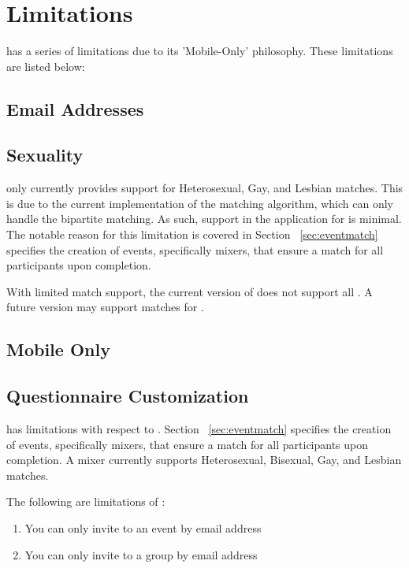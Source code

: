 \section{Limitations}
\label{sec:limitations}

\Friending{} has a series of limitations due to its 'Mobile-Only' philosophy. These limitations are listed below:

\subsection{Email Addresses}
\label{sec:limit_email}

\subsection{Sexuality}
\label{sec:limit_sexuality}

\Friending{} only currently provides support for Heterosexual, Gay, and Lesbian matches. This is due to the current implementation of the matching algorithm, which can only handle the bipartite matching. As such, support in the application for  is minimal. The notable reason for this limitation is covered in Section ~\ref{sec:eventmatch} specifies the creation of events, specifically mixers, that ensure a match for all participants upon completion. 

With limited match support, the current version of \Friending{} does not support all . A future version may support matches for .

\subsection{Mobile Only}
\label{sec:limit_mobile}

\subsection{Questionnaire Customization}
\label{sec:limit_questions}

\Friending{} has limitations with respect to .  Section ~\ref{sec:eventmatch} specifies the creation of events, specifically mixers, that ensure a match for all participants upon completion.  A mixer currently supports Heterosexual, Bisexual, Gay, and Lesbian matches.  

The following are limitations of \Friending{}:
\begin{enumerate}
\item You can only invite to an event by email address
\item You can only invite to a group by email address
\end{enumerate}